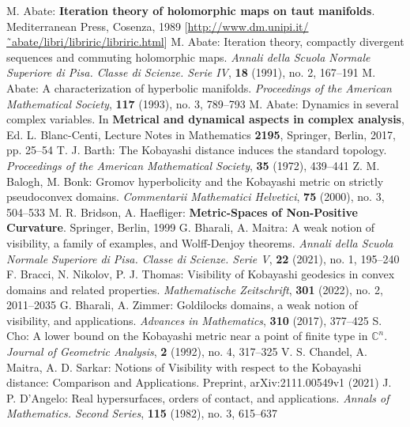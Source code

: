 \begin{thebibliography}{widest entry}
   M. Abate: \textbf{Iteration theory of holomorphic maps on taut manifolds}. Mediterranean Press, Cosenza, 1989 [\url{http://www.dm.unipi.it/˜abate/libri/libriric/libriric.html}]
   M. Abate: Iteration theory, compactly divergent sequences and commuting holomorphic maps. \textit{Annali della Scuola Normale Superiore di Pisa. Classe di Scienze. Serie IV}, \textbf{18} (1991), no. 2, 167--191
   M. Abate: A characterization of hyperbolic manifolds. \textit{Proceedings of the American Mathematical Society}, \textbf{117} (1993), no. 3, 789--793
   M. Abate: Dynamics in several complex variables. In \textbf{Metrical and dynamical aspects in complex analysis}, Ed. L. Blanc-Centi, Lecture Notes in Mathematics \textbf{2195}, Springer, Berlin, 2017, pp. 25--54
   T. J. Barth: The Kobayashi distance induces the standard topology. \textit{Proceedings of the American Mathematical Society}, \textbf{35} (1972), 439--441
   Z. M. Balogh, M. Bonk: Gromov hyperbolicity and the Kobayashi metric on strictly pseudoconvex domains. \textit{Commentarii Mathematici Helvetici}, \textbf{75} (2000), no. 3, 504--533
   M. R. Bridson, A. Haefliger: \textbf{Metric-Spaces of Non-Positive Curvature}. Springer, Berlin, 1999
   G. Bharali, A. Maitra: A weak notion of visibility, a family of examples, and Wolff-Denjoy theorems. \textit{Annali della Scuola Normale Superiore di Pisa. Classe di Scienze. Serie V}, \textbf{22} (2021), no. 1, 195--240
   F. Bracci, N. Nikolov, P. J. Thomas: Visibility of Kobayashi geodesics in convex domains and related properties. \textit{Mathematische Zeitschrift}, \textbf{301} (2022), no. 2, 2011--2035
   G. Bharali, A. Zimmer: Goldilocks domains, a weak notion of visibility, and applications. \textit{Advances in Mathematics}, \textbf{310} (2017), 377--425
   S. Cho: A lower bound on the Kobayashi metric near a point of finite type in $\mathbb{C}^n$. \textit{Journal of Geometric Analysis}, \textbf{2} (1992), no. 4, 317--325
   V. S. Chandel, A. Maitra, A. D. Sarkar: Notions of Visibility with respect to the Kobayashi distance: Comparison and Applications. Preprint, arXiv:2111.00549v1 (2021)
   J. P. D'Angelo: Real hypersurfaces, orders of contact, and applications. \textit{Annals of Mathematics. Second Series}, \textbf{115} (1982), no. 3, 615--637

\end{thebibliography}
